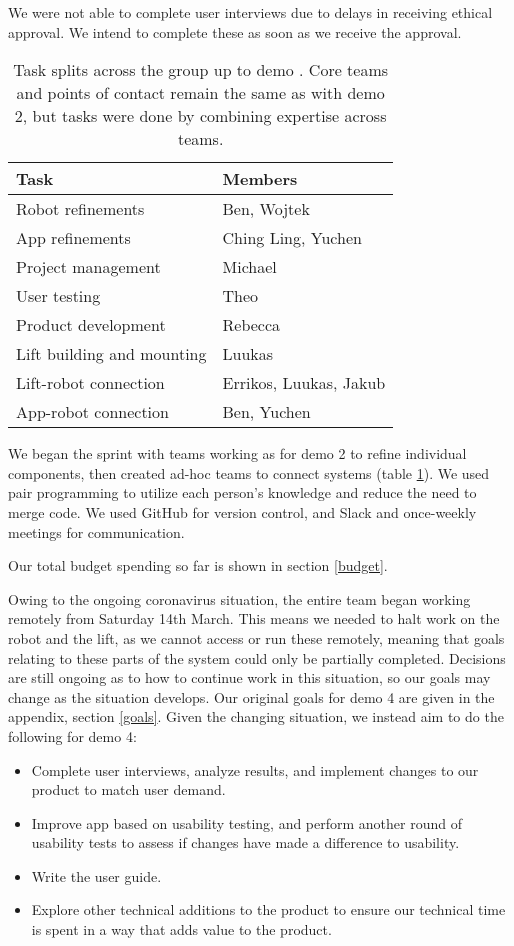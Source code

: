 \documentclass{article}
\begin{document}
We were not able to complete user interviews due to delays in receiving ethical approval. We intend to complete these as soon as we receive the approval. 

\begin{table}[]
  \begin{tabular}{l|l}
    Task & Members \\
    \hline
    Robot refinements & Ben, Wojtek \\
    App refinements & Ching Ling, Yuchen \\
    Project management & Michael \\
    User testing & Theo \\
    Product development & Rebecca \\
    Lift building and mounting & Luukas \\
    Lift-robot connection & Errikos, Luukas, Jakub \\
    App-robot connection & Ben, Yuchen \\
  \end{tabular}
  \caption{Task splits across the group up to demo \demoNumber. Core teams and points of contact remain the same as with demo 2, but tasks were done by combining expertise across teams. }
  \label{tab:group-split}
\end{table}

We began the sprint with teams working as for demo 2 to refine individual components, then created ad-hoc teams to connect systems (table \ref{tab:group-split}). We used pair programming to utilize each person's knowledge and reduce the need to merge code. We used GitHub for version control, and Slack and once-weekly meetings for communication.

Our total budget spending so far is shown in section \ref{budget}.

Owing to the ongoing coronavirus situation, the entire team began working remotely from Saturday 14th March. This means we needed to halt work on the robot and the lift, as we cannot access or run these remotely, meaning that goals relating to these parts of the system could only be partially completed. Decisions are still ongoing as to how to continue work in this situation, so our goals may change as the situation develops. Our original goals for demo 4 are given in the appendix, section \ref{goals}. Given the changing situation, we instead aim to do the following for demo 4:
\begin{itemize}
  \item Complete user interviews, analyze results, and implement changes to our product to match user demand.
  \item Improve app based on usability testing, and perform another round of usability tests to assess if changes have made a difference to usability. 
  \item Write the user guide. 
  \item Explore other technical additions to the product to ensure our technical time is spent in a way that adds value to the product. 
\end{itemize}
\end{document}
